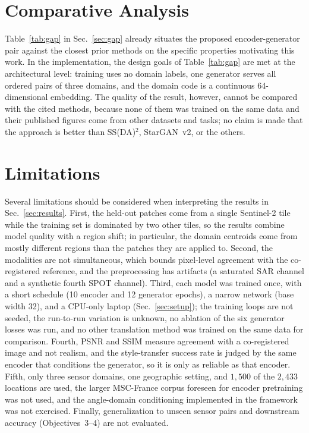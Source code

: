 \documentclass[runningheads]{llncs}
\begin{document}
\section{Comparative Analysis}
Table~\ref{tab:gap} in Sec.~\ref{sec:gap} already situates the proposed encoder-generator pair against the closest prior methods on the specific properties motivating this work. In the implementation, the design goals of Table~\ref{tab:gap} are met at the architectural level: training uses no domain labels, one generator serves all ordered pairs of three domains, and the domain code is a continuous 64-dimensional embedding. The quality of the result, however, cannot be compared with the cited methods, because none of them was trained on the same data and their published figures come from other datasets and tasks; no claim is made that the approach is better than SS(DA)$^2$, StarGAN~v2, or the others.

\section{Limitations}
\label{sec:limitations}
Several limitations should be considered when interpreting the results in Sec.~\ref{sec:results}. First, the held-out patches come from a single Sentinel-2 tile while the training set is dominated by two other tiles, so the results combine model quality with a region shift; in particular, the domain centroids come from mostly different regions than the patches they are applied to. Second, the modalities are not simultaneous, which bounds pixel-level agreement with the co-registered reference, and the preprocessing has artifacts (a saturated SAR channel and a synthetic fourth SPOT channel). Third, each model was trained once, with a short schedule (10 encoder and 12 generator epochs), a narrow network (base width 32), and a CPU-only laptop (Sec.~\ref{sec:setup}); the training loops are not seeded, the run-to-run variation is unknown, no ablation of the six generator losses was run, and no other translation method was trained on the same data for comparison. Fourth, PSNR and SSIM measure agreement with a co-registered image and not realism, and the style-transfer success rate is judged by the same encoder that conditions the generator, so it is only as reliable as that encoder. Fifth, only three sensor domains, one geographic setting, and $1{,}500$ of the $2{,}433$ locations are used, the larger MSC-France corpus foreseen for encoder pretraining was not used, and the angle-domain conditioning implemented in the framework was not exercised. Finally, generalization to unseen sensor pairs and downstream accuracy (Objectives~3--4) are not evaluated.
\end{document}
